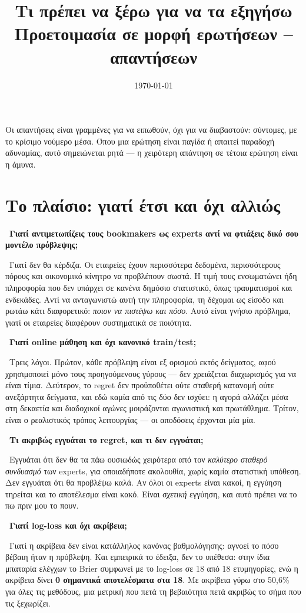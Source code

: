 \documentclass[11pt,a4paper]{article}
\title{\textbf{Τι πρέπει να ξέρω για να τα εξηγήσω}\\[6pt]
\large\normalfont Προετοιμασία σε μορφή ερωτήσεων -- απαντήσεων}
\author{}
\date{\today}
\newcommand{\qa}[2]{%
  \par\medskip\noindent{\color{qcol}\textbf{Ε.}}\ \textbf{#1}\par
  \noindent{\color{qcol}\textbf{Α.}}\ #2\par}
\begin{document}
\maketitle

\noindent\small
Οι απαντήσεις είναι γραμμένες για να ειπωθούν, όχι για να διαβαστούν: σύντομες, με το
κρίσιμο νούμερο μέσα. Όπου μια ερώτηση είναι παγίδα ή απαιτεί παραδοχή αδυναμίας, αυτό
σημειώνεται ρητά --- η χειρότερη απάντηση σε τέτοια ερώτηση είναι η άμυνα.
\normalsize

\section{Το πλαίσιο: γιατί έτσι και όχι αλλιώς}

\qa{Γιατί αντιμετωπίζεις τους bookmakers ως experts αντί να φτιάξεις δικό σου μοντέλο
πρόβλεψης;}
{Γιατί δεν θα κέρδιζα. Οι εταιρείες έχουν περισσότερα δεδομένα, περισσότερους πόρους και
οικονομικό κίνητρο να προβλέπουν σωστά. Η τιμή τους ενσωματώνει ήδη πληροφορία που δεν
υπάρχει σε κανένα δημόσιο στατιστικό, όπως τραυματισμοί και ενδεκάδες. Αντί να ανταγωνιστώ
αυτή την πληροφορία, τη δέχομαι ως είσοδο και ρωτάω κάτι διαφορετικό: \emph{ποιον να
πιστέψω και πόσο}. Αυτό είναι γνήσιο πρόβλημα, γιατί οι εταιρείες διαφέρουν συστηματικά σε
ποιότητα.}

\qa{Γιατί online μάθηση και όχι κανονικό train/test;}
{Τρεις λόγοι. Πρώτον, κάθε πρόβλεψη είναι εξ ορισμού εκτός δείγματος, αφού χρησιμοποιεί μόνο
τους προηγούμενους γύρους --- δεν χρειάζεται διαχωρισμός για να είναι τίμια. Δεύτερον, το
regret δεν προϋποθέτει ούτε σταθερή κατανομή ούτε ανεξάρτητα δείγματα, και εδώ καμία από τις
δύο δεν ισχύει: η αγορά αλλάζει μέσα στη δεκαετία και διαδοχικοί αγώνες μοιράζονται
αγωνιστική και πρωτάθλημα. Τρίτον, είναι ο ρεαλιστικός τρόπος λειτουργίας --- οι αποδόσεις
έρχονται μία μία.}

\qa{Τι ακριβώς εγγυάται το regret, και τι δεν εγγυάται;}
{Εγγυάται ότι δεν θα τα πάω ουσιωδώς χειρότερα από τον \emph{καλύτερο σταθερό συνδυασμό} των
experts, για οποιαδήποτε ακολουθία, χωρίς καμία στατιστική υπόθεση. Δεν εγγυάται ότι θα
προβλέψω καλά. Αν όλοι οι experts είναι κακοί, η εγγύηση τηρείται και το αποτέλεσμα είναι
κακό. Είναι \emph{σχετική} εγγύηση, και αυτό πρέπει να το πω πριν μου το πουν.}

\qa{Γιατί log-loss και όχι ακρίβεια;}
{Γιατί η ακρίβεια δεν είναι κατάλληλος κανόνας βαθμολόγησης: αγνοεί το πόσο βέβαιη ήταν η
πρόβλεψη. Και εμπειρικά το έδειξα, δεν το υπέθεσα: στην ίδια μπαταρία ελέγχων το Brier
συμφωνεί με το log-loss σε 18 από 18 ετυμηγορίες, ενώ η ακρίβεια δίνει \textbf{0 σημαντικά
αποτελέσματα στα 18}. Με ακρίβεια γύρω στο 50,6\% για όλες τις μεθόδους, μια μετρική που
πετά τη βεβαιότητα πετά ακριβώς το σήμα που τις ξεχωρίζει.}
\end{document}
